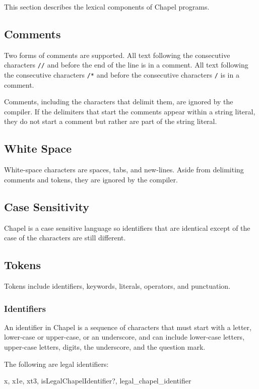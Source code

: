 \label{Lexical_Structure}

This section describes the lexical components of Chapel programs.

\subsection{Comments}
\label{Comments}

Two forms of comments are supported.  All text following the
consecutive characters {\tt //} and before the end of the line is in a
comment.  All text following the consecutive characters {\tt /*} and
before the consecutive characters {\tt */} is in a comment.

Comments, including the characters that delimit them, are ignored by
the compiler.  If the delimiters that start the comments appear within
a string literal, they do not start a comment but rather are part of
the string literal.

\subsection{White Space}
\label{White_Space}

White-space characters are spaces, tabs, and new-lines.  Aside from
delimiting comments and tokens, they are ignored by the compiler.

\subsection{Case Sensitivity}
\label{Case_Sensitivity}

Chapel is a case sensitive language so identifiers that are identical
except of the case of the characters are still different.

\subsection{Tokens}
\label{Tokens}

Tokens include identifiers, keywords, literals, operators, and
punctuation.

\subsubsection{Identifiers}
\label{Identifiers}

An identifier in Chapel is a sequence of characters that must start
with a letter, lower-case or upper-case, or an underscore, and can
include lower-case letters, upper-case letters, digits, the
underscore, and the question mark.
\begin{example}
The following are legal identifiers:
\begin{chapel}
  x, x1e, xt3, isLegalChapelIdentifier?, legal_chapel_identifier
\end{chapel}
\end{example}

